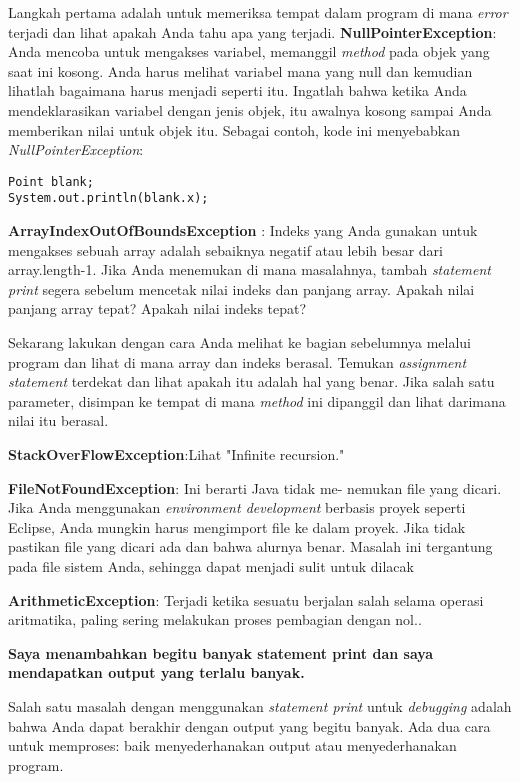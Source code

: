 \documentclass[12pt,b5paper,openright,twoside]{book}
\begin{document}
\noindent Langkah pertama adalah untuk memeriksa tempat dalam program di mana \textit{error} terjadi dan lihat apakah Anda tahu apa yang terjadi.
\textbf{NullPointerException}: Anda mencoba untuk mengakses variabel, memanggil \textit{method} pada objek yang saat ini kosong. Anda harus melihat variabel mana yang null dan kemudian lihatlah bagaimana harus menjadi seperti itu. Ingatlah bahwa ketika Anda mendeklarasikan variabel dengan jenis objek, itu awalnya kosong sampai Anda memberikan nilai untuk objek itu. Sebagai contoh, kode ini menyebabkan \textit{NullPointerException}:
\begin{lstlisting}
Point blank;
System.out.println(blank.x);
\end{lstlisting}

\noindent \textbf{ArrayIndexOutOfBoundsException} : Indeks yang Anda gunakan untuk mengakses sebuah array adalah sebaiknya negatif atau lebih besar dari array.length-1. Jika Anda menemukan di mana masalahnya, tambah \textit{statement print} segera sebelum mencetak nilai indeks dan panjang array. Apakah nilai panjang array tepat? Apakah nilai indeks tepat?

\noindent Sekarang lakukan dengan cara Anda melihat ke bagian sebelumnya melalui program dan lihat di mana array dan indeks berasal. Temukan \textit{assignment statement}  terdekat dan lihat apakah itu adalah hal yang benar. Jika salah satu parameter, disimpan ke tempat di mana \textit{method} ini dipanggil dan lihat darimana nilai itu berasal.

\noindent \textbf{StackOverFlowException}:Lihat "Infinite recursion."

\noindent \textbf{FileNotFoundException}: Ini berarti Java tidak me- nemukan file yang dicari. Jika Anda menggunakan \textit{environment development} berbasis proyek seperti Eclipse, Anda mungkin harus mengimport file ke dalam proyek. Jika tidak pastikan file yang dicari ada dan bahwa alurnya benar. Masalah ini tergantung pada file sistem Anda, sehingga dapat menjadi sulit untuk dilacak

\noindent \textbf{ArithmeticException}: Terjadi ketika sesuatu berjalan salah selama operasi aritmatika, paling sering melakukan proses pembagian dengan nol..

\noindent \textbf{Saya menambahkan begitu banyak statement print dan saya mendapatkan output yang terlalu banyak.}

\noindent Salah satu masalah dengan menggunakan \textit{statement print} untuk \textit{debugging} adalah bahwa Anda dapat berakhir dengan output yang begitu banyak. Ada dua cara untuk memproses: 
baik menyederhanakan output atau menyederhanakan program.
\end{document}
